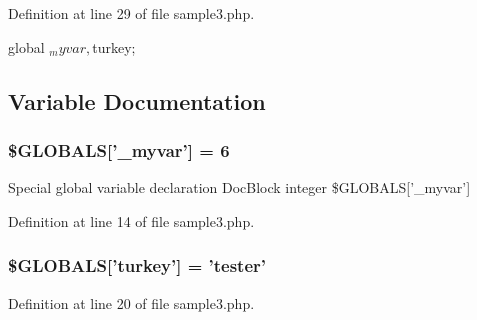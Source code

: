 \-Definition at line 29 of file sample3.\-php.


\begin{DoxyCode}
{
    global $_myvar, $turkey;
}
\end{DoxyCode}


\subsection{\-Variable \-Documentation}
\hypertarget{sample3_8php_af57fd0dc3f93457714d80dc8f32477a3}{
\subsubsection[{\$\-G\-L\-O\-B\-A\-L\-S}]{\setlength{\rightskip}{0pt plus 5cm}\$\-G\-L\-O\-B\-A\-L\-S\mbox{[}'\-\_\-myvar'\mbox{]} = 6}}\label{sample3_8php_af57fd0dc3f93457714d80dc8f32477a3}
\-Special global variable declaration \-Doc\-Block  integer \$\-G\-L\-O\-B\-A\-L\-S\mbox{[}'\-\_\-myvar'\mbox{]} 

\-Definition at line 14 of file sample3.\-php.

\hypertarget{sample3_8php_a421f2488ac12fbe786b30a161bbfef97}{
\subsubsection[{\$\-G\-L\-O\-B\-A\-L\-S}]{\setlength{\rightskip}{0pt plus 5cm}\$\-G\-L\-O\-B\-A\-L\-S\mbox{[}'turkey'\mbox{]} = 'tester'}}\label{sample3_8php_a421f2488ac12fbe786b30a161bbfef97}


\-Definition at line 20 of file sample3.\-php.

